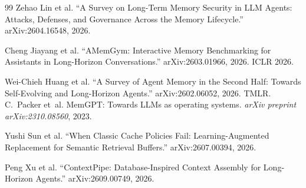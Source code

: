 \begin{thebibliography}{99}
Zehao Lin et al.
``A Survey on Long-Term Memory Security in LLM Agents: Attacks, Defenses, and Governance Across the Memory Lifecycle.''
arXiv:2604.16548, 2026.

Cheng Jiayang et al.
``AMemGym: Interactive Memory Benchmarking for Assistants in Long-Horizon Conversations.''
arXiv:2603.01966, 2026. ICLR 2026.

Wei-Chieh Huang et al.
``A Survey of Agent Memory in the Second Half: Towards Self-Evolving and Long-Horizon Agents.''
arXiv:2602.06052, 2026. TMLR.
C.~Packer et~al.
\newblock MemGPT: Towards LLMs as operating systems.
\newblock \emph{arXiv preprint arXiv:2310.08560}, 2023.


Yushi Sun et al.
``When Classic Cache Policies Fail: Learning-Augmented Replacement for Semantic Retrieval Buffers.''
arXiv:2607.00394, 2026.

Peng Xu et al.
``ContextPipe: Database-Inspired Context Assembly for Long-Horizon Agents.''
arXiv:2609.00749, 2026.
\end{thebibliography}

